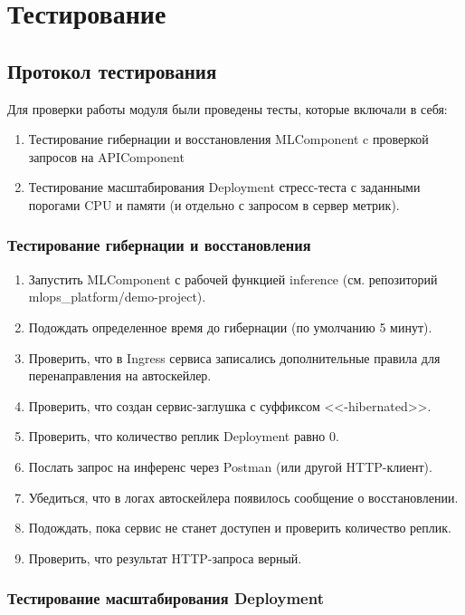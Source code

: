 \documentclass[a4paper]{article}
\begin{document}
\section{Тестирование}
\subsection{Протокол тестирования}
Для проверки работы модуля были проведены тесты, которые включали в себя:

\begin{enumerate}
  \item Тестирование гибернации и восстановления MLComponent c
    проверкой запросов на APIComponent
  \item Тестирование масштабирования Deployment стресс-теста с
    заданными порогами CPU и памяти (и отдельно с запросом в
    сервер метрик).
\end{enumerate}

\subsubsection{Тестирование гибернации и восстановления}

\begin{enumerate}
  \item Запустить MLComponent с рабочей функцией inference (см.
    репозиторий mlops\_platform/demo-project).
  \item Подождать определенное время до гибернации (по умолчанию 5 минут).
  \item Проверить, что в Ingress сервиса записались дополнительные правила
    для перенаправления на автоскейлер.
  \item Проверить, что создан сервис-заглушка с суффиксом <<-hibernated>>.
  \item Проверить, что количество реплик Deployment равно 0.
  \item Послать запрос на инференс через Postman (или другой HTTP-клиент).
  \item Убедиться, что в логах автоскейлера появилось сообщение о
    восстановлении.
  \item Подождать, пока сервис не станет доступен и проверить
    количество реплик.
  \item Проверить, что результат HTTP-запроса верный.
\end{enumerate}

\subsubsection{Тестирование масштабирования Deployment}
\end{document}
